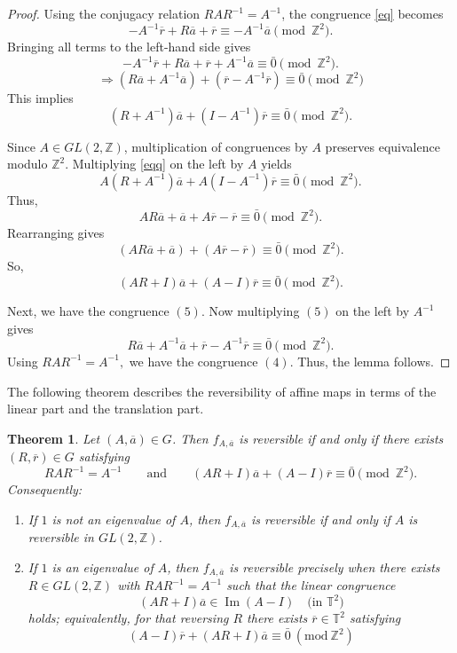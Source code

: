 \documentclass[12pt]{amsart}
\theoremstyle{plain}
\newtheorem{theorem}{Theorem}[section]
\theoremstyle{definition}
\theoremstyle{remark}
\begin{document}
\begin{proof}
Using the conjugacy relation $RAR^{-1} = A^{-1}$, the congruence
\eqref{eq} becomes
$$
- A^{-1} \overline{r} + R\overline{a} + \overline{r} \equiv -A^{-1} \overline{a} \pmod{\mathbb Z^2}.
$$
Bringing all terms to the left-hand side gives
$$
- A^{-1} \overline{r} + R\overline{a} + \overline{r} + A^{-1} \overline{a} \equiv \bar{0} \pmod{\mathbb Z^2}.
$$
$$
\Rightarrow (R\overline{a} + A^{-1}\overline{a}) + (\overline{r} - A^{-1} \overline{r}) \equiv \bar{0} \pmod{\mathbb Z^2} 
$$
This implies
\begin{equation}\label{eqq}
(R + A^{-1})\overline{a} + (I - A^{-1})\overline{r} \equiv \bar{0} \pmod{\mathbb Z^2}.
\end{equation}

Since $A \in GL(2, \mathbb Z)$, multiplication of congruences by $A$
preserves equivalence modulo $\mathbb Z^2$.
Multiplying \eqref{eqq} on the left by $A$ yields
$$
A(R + A^{-1})\overline{a}+ A(I - A^{-1})\overline{r} \equiv \bar{0} \pmod{\mathbb Z^2}.
$$
Thus,
$$
AR\overline{a} + \overline{a} + A\overline{r} - \overline{r} \equiv \bar{0} \pmod{\mathbb Z^2}.
$$
Rearranging gives
$$
(AR\overline{a} + \overline{a}) + (A\overline{r} - \overline{r}) \equiv \bar{0} \pmod{\mathbb Z^2}.
$$
So,
$$
(AR + I)\overline{a} + (A - I)\overline{r} \equiv \bar{0} \pmod{\mathbb Z^2}.
$$

Next, we have the congruence $(5).$ Now multiplying $(5)$ on the left by $A^{-1}$ gives
\[R\overline{a}+A^{-1}\overline{a}+\overline{r}-A^{-1}\overline{r}\equiv \bar{0} \pmod{\mathbb Z^2}.\]
 Using $RAR^{-1}=A^{-1},$ we have the congruence $(4).$ Thus, the lemma follows.
\end{proof}

The following theorem describes the reversibility of affine maps in terms of the linear part and the translation part.

\begin{theorem}\label{thm:affine-reversible}
Let $(A,\overline{a})\in G$.  Then \(f_{A,\overline{a}}\) is reversible
if and only if there exists \((R,\overline{r})\in G\) satisfying
$$
RAR^{-1}=A^{-1}
\qquad\text{and}\qquad
(AR + I)\overline{a} + (A - I)\overline{r}\equiv \bar{0} \pmod{\mathbb{Z}^2}.
$$
Consequently:
\begin{enumerate}
  \item If $1$ is \emph{not} an eigenvalue of $A$, then 
$f_{A,\overline{a}}$ is reversible if and only if $A$ is reversible in $GL(2,\mathbb{Z})$.

\item If \(1\) is an eigenvalue of \(A\), then \(f_{A,\overline{a}}\) is reversible
  precisely when there exists \(R\in GL(2,\mathbb{Z})\) with \(RAR^{-1}=A^{-1}\)
  such that the linear congruence
  $$
  (AR+I)\overline{a} \in {\operatorname{Im}}(A-I)\quad\text{$($in }\mathbb{T}^2\text{$)$}
  $$
  holds; equivalently, for that reversing \(R\) there exists \(\overline{r}\in\mathbb{T}^2\)
  satisfying $$(A-I)\overline{r}+(AR+I)\overline{a}\equiv \bar{0} ~(\text{mod}~ \mathbb Z^2)$$
\end{enumerate}
\end{theorem}
\end{document}
